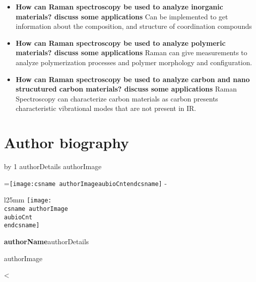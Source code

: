 \documentclass[11pt]{article}
\makeatletter
\newcounter{aubio}
\newcommand{\checkheight}[1]{%
  \par \penalty-100\begingroup%
  \setbox8=\hbox{#1}%
  \setlength{\dimen@}{\ht8}%
  \dimen@ii\pagegoal \advance\dimen@ii-\pagetotal
  \ifdim \dimen@>\dimen@ii
    \break
  \fi\endgroup}
\def\printBio{%
  \@tempcnta=0
   \loop
     \advance \@tempcnta by 1
     \def\aubioCnt{\the\@tempcnta}
     \setlength{\intextsep}{0pt}%
     \setlength{\columnsep}{10pt}%
     \newbox\boxa%
     \setbox\boxa\vbox{\csname authorDetails\aubioCnt\endcsname}
     \expandafter\ifx\csname authorImage\aubioCnt\endcsname\relax%
      \else%
       \checkheight{\texttt{[image: \\csname authorImage\\aubioCnt\\endcsname]}}
        \begin{wrapfigure}{l}{25mm}
         \texttt{[image: \\csname authorImage\\aubioCnt\\endcsname]}%
        \end{wrapfigure}\par
      \fi
     {\parindent0pt\textbf{\csname authorName\aubioCnt\endcsname}\csname authorDetails\aubioCnt\endcsname \par\bigskip%
     \expandafter\ifx\csname authorImage\aubioCnt\endcsname\relax\else%
      \ifdim\the\ht\boxa < 90pt\vskip\dimexpr(90pt -\the\ht\boxa-1pc)\fi%
     \fi}%
      \ifnum\@tempcnta < \theaubio
   \repeat
   }
\makeatother
\begin{document}
\begin{itemize}
  \item \relax \textbf{How can Raman spectroscopy be used to analyze inorganic materials? {\textemdash} discuss some applications} \mbox{}\protect\newline * Can be implemented to get information about the composition, and structure of coordination compounds \mbox{}\protect\newline 
  \item \relax \textbf{How can Raman spectroscopy be used to analyze polymeric materials? {\textemdash} discuss some applications} \mbox{}\protect\newline * Raman can give measurements to analyze polymerization processes and polymer morphology and configuration. \mbox{}\protect\newline 
  \item \relax \textbf{How can Raman spectroscopy be used to analyze carbon and nano strucutured carbon materials? {\textemdash} discuss some applications} \mbox{}\protect\newline * Raman Spectroscopy can characterize carbon materials as carbon presents characteristic vibrational modes that are not present in IR. \mbox{}\protect\newline 
\end{itemize}
  \clearpage 
    





\section*{Author biography}

\printBio 
\end{document}
